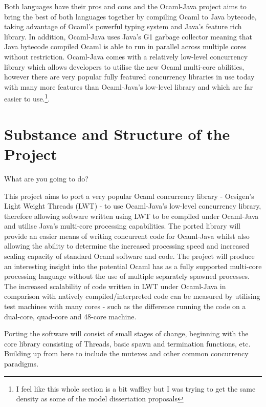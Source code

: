 \documentclass[a4paper]{article}
\begin{document}
Both languages have their pros and cons and the Ocaml-Java project aims to bring the best of both languages together by compiling Ocaml to Java bytecode, taking advantage of Ocaml's powerful typing system and Java's feature rich library. In addition, Ocaml-Java uses Java's G1 garbage collector meaning that Java bytecode compiled Ocaml is able to run in parallel across multiple cores without restriction. Ocaml-Java comes with a relatively low-level concurrency library which allows developers to utilise the new Ocaml multi-core abilities, however there are very popular fully featured concurrency libraries in use today with many more features than Ocaml-Java's low-level library and which are far easier to use.\footnote{I feel like this whole section is a bit waffley but I was trying to get the same density as some of the model dissertation proposals}.

\section{Substance and Structure of the Project}
\label{sec:substance}

What are you going to do?

This project aims to port a very popular Ocaml concurrency library - Ocsigen's Light Weight Threads (LWT) - to use Ocaml-Java's low-level concurrency library, therefore allowing software written using LWT to be compiled under Ocaml-Java and utilise Java's multi-core processing capabilities. The ported library will provide an easier means of writing concurrent code for Ocaml-Java whilst also allowing the ability to determine the increased processing speed and increased scaling capacity of standard Ocaml software and code. The project will produce an interesting insight into the potential Ocaml has as a fully supported multi-core processing language without the use of multiple separately spawned processes. The increased scalability of code written in LWT under Ocaml-Java in comparison with natively compiled/interpreted code can be measured by utilising test machines with many cores - such as the difference running the code on a dual-core, quad-core and 48-core machine.

Porting the software will consist of small stages of change, beginning with the core library consisting of Threads, basic spawn and termination functions, etc. Building up from here to include the mutexes and other common concurrency paradigms.
\end{document}
